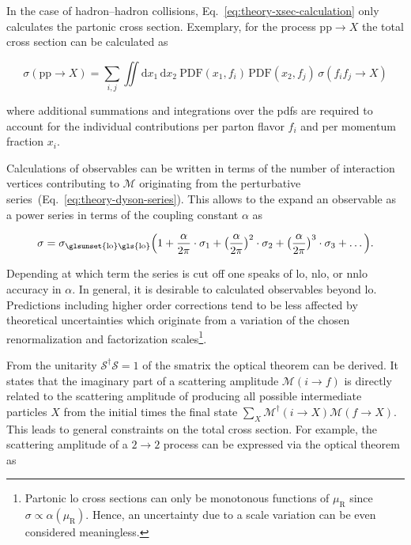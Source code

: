 In the case of hadron--hadron collisions, Eq.~\ref{eq:theory-xsec-calculation} only calculates the partonic cross section. Exemplary, for the process $\mathrm{pp}\to X$ the total cross section can be calculated as

\begin{equation}
\sigma(\mathrm{pp}\to X)=\sum_{i,j}\iint\mathrm{d}x_{1}\,\mathrm{d}x_{2}~\mathrm{PDF}(x_{1},f_{i})\,\mathrm{PDF}(x_{2},f_{j})\,\sigma(f_{i}f_{j}\to X)
\end{equation}

where additional summations and integrations over the \glspl{pdf} are required to account for the individual contributions per parton flavor $f_{i}$ and per momentum fraction $x_{i}$.


Calculations of observables can be written in terms of the number of interaction vertices contributing to $\mathcal{M}$ originating from the perturbative series~(Eq.~\ref{eq:theory-dyson-series}). This allows to the expand an observable as a power series in terms of the coupling constant $\alpha$ as

\begin{equation}
\sigma=\sigma_\mathrm{\glsunset{lo}\gls{lo}}\Big(1+\frac{\alpha}{2\pi}\cdot\sigma_\mathrm{1}+\big(\frac{\alpha}{2\pi}\big)^2\cdot\sigma_{2}+\big(\frac{\alpha}{2\pi}\big)^{3}\cdot\sigma_{3}+\ldots\Big).
\end{equation}


Depending at which term the series is cut off one speaks of \gls{lo}, \gls{nlo}, or \gls{nnlo} accuracy in $\alpha$. In general, it is desirable to calculated observables beyond \gls{lo}. Predictions including higher order corrections tend to be less affected by theoretical uncertainties which originate from a variation of the chosen renormalization and factorization scales\footnote{Partonic \gls{lo} cross sections can only be monotonous functions of $\mu_\mathrm{R}$ since $\sigma\propto\alpha(\mu_\mathrm{R})$. Hence, an uncertainty due to a scale variation can be even considered meaningless.}.

From the unitarity $\mathcal{S}^{\dagger}\mathcal{S}=1$ of the \gls{smatrix} the optical theorem can be derived. It states that the imaginary part of a scattering amplitude $\mathcal{M}(i\to f)$ is directly related to the scattering amplitude of producing all possible intermediate particles $X$ from the initial times the final state $\sum_{X}\mathcal{M}^\dagger(i\to X)\mathcal{M}(f\to X)$. This leads to general constraints on the total cross section. For example, the scattering amplitude of a $2\to2$ process can be expressed via the optical theorem as

